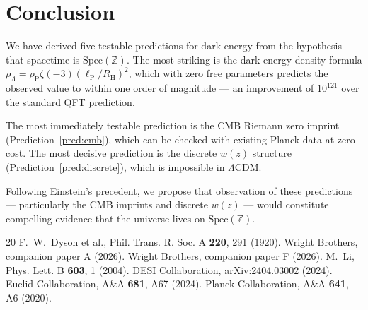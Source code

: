 \documentclass[11pt,a4paper]{article}
\newcommand{\Spec}{\mathrm{Spec}}
\newcommand{\lP}{\ell_{\mathrm{P}}}
\newcommand{\RH}{R_{\mathrm{H}}}
\newcommand{\rhoP}{\rho_{\mathrm{P}}}
\begin{document}
\section{Conclusion}

We have derived five testable predictions for dark energy from
the hypothesis that spacetime is $\Spec(\mathbb{Z})$.
The most striking is the dark energy density formula
$\rho_\Lambda = \rhoP \zeta(-3) (\lP/\RH)^2$, which with zero
free parameters predicts the observed value to within one order
of magnitude --- an improvement of $10^{121}$ over the standard
QFT prediction.

The most immediately testable prediction is the CMB Riemann zero
imprint (Prediction~\ref{pred:cmb}), which can be checked with
existing Planck data at zero cost. The most decisive prediction
is the discrete $w(z)$ structure (Prediction~\ref{pred:discrete}),
which is impossible in $\Lambda$CDM.

Following Einstein's precedent, we propose that observation of
these predictions --- particularly the CMB imprints and discrete
$w(z)$ --- would constitute compelling evidence that the universe
lives on $\Spec(\mathbb{Z})$.

\begin{thebibliography}{20}
 F.~W.~Dyson et al., Phil. Trans. R. Soc. A \textbf{220}, 291 (1920).
 Wright Brothers, companion paper A (2026).
 Wright Brothers, companion paper F (2026).
 M.~Li, Phys. Lett. B \textbf{603}, 1 (2004).
 DESI Collaboration, arXiv:2404.03002 (2024).
 Euclid Collaboration, A\&A \textbf{681}, A67 (2024).
 Planck Collaboration, A\&A \textbf{641}, A6 (2020).
\end{thebibliography}
\end{document}
